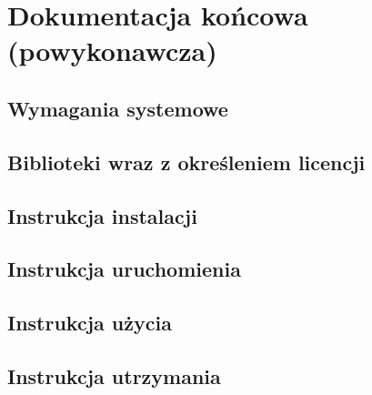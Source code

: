 \documentclass[10pt,a4paper]{article}
\begin{document}
\section{Dokumentacja końcowa (powykonawcza)}

\subsection{Wymagania systemowe}
%

\subsection{Biblioteki wraz z określeniem licencji}
%

\subsection{Instrukcja instalacji}
%

\subsection{Instrukcja uruchomienia}
% 

\subsection{Instrukcja użycia}
%

\subsection{Instrukcja utrzymania}
%
\end{document}

